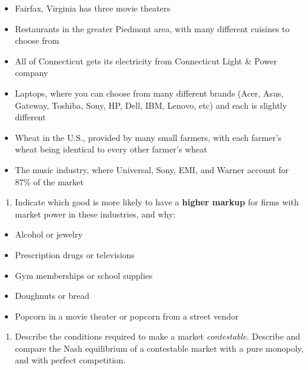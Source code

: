 \documentclass[
  11pt,
]{article}
\providecommand{\tightlist}{%
  \setlength{\itemsep}{0pt}\setlength{\parskip}{0pt}}
\begin{document}
\begin{itemize}
\tightlist
\item
  Fairfax, Virginia has three movie theaters
\item
  Restaurants in the greater Piedmont area, with many different cuisines
  to choose from
\item
  All of Connecticut gets its electricity from Connecticut Light \&
  Power company
\item
  Laptops, where you can choose from many different brands (Acer, Asus,
  Gateway, Toshiba, Sony, HP, Dell, IBM, Lenovo, etc) and each is
  slightly different
\item
  Wheat in the U.S., provided by many small farmers, with each farmer's
  wheat being identical to every other farmer's wheat
\item
  The music industry, where Universal, Sony, EMI, and Warner account for
  87\% of the market \clearpage
\end{itemize}

\begin{enumerate}
\def\labelenumi{\arabic{enumi}.}
\setcounter{enumi}{2}
\tightlist
\item
  Indicate which good is more likely to have a \textbf{higher markup}
  for firms with market power in these industries, and why:
\end{enumerate}

\begin{itemize}
\tightlist
\item
  Alcohol or jewelry
\item
  Prescription drugs or televisions
\item
  Gym memberships or school supplies
\item
  Doughnuts or bread
\item
  Popcorn in a movie theater or popcorn from a street vendor
\end{itemize}

\vspace{3in}

\begin{enumerate}
\def\labelenumi{\arabic{enumi}.}
\setcounter{enumi}{3}
\tightlist
\item
  Describe the conditions required to make a market \emph{contestable.}
  Describe and compare the Nash equilibrium of a contestable market with
  a pure monopoly, and with perfect competition.
\end{enumerate}

\vspace{3in}
\end{document}
